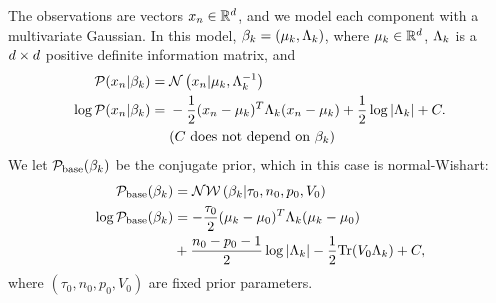 \begin{ex}
%
The observations are vectors $x_n \in \mathbb{R}^d$,
and we model each component with a multivariate Gaussian.
In this model, $\beta_k = (\mu_k, \Lambda_k)$,
where $\mu_k \in \mathbb{R}^d$, $\Lambda_k$ is a $d\times d$ positive
definite information matrix, and
%
\begin{align*}
%
\p(\x_\n \vert \beta_\k) ={}& \normdist{\x_n \vert \mu_\k, \Lambda_\k^{-1}} \\
\logp(\x_\n \vert \beta_\k) ={}&
    -\frac{1}{2}(\x_n - \mu_k)^T \Lambda_\k (\x_n - \mu_k)
    + \frac{1}{2} \log |\Lambda_\k| + \const.\\
    & \constdesc{\beta_\k}
%
\end{align*}
We let $\mathcal{P}_{\mathrm{base}}(\beta_k)$ be the conjugate prior, which in this case is normal-Wishart:
\begin{align*}
  \mathcal{P}_{\mathrm{base}}(\beta_k) &= \mathcal{N}\mathcal{W}\left(\beta_k \vert \tau_0, n_0, p_0, V_0\right)\\
  \log\mathcal{P}_{\mathrm{base}}(\beta_k) &=
      -\frac{\tau_0}{2}(\mu_k - \mu_0)^T \Lambda_k (\mu_k - \mu_0)\\
      &{} + \frac{n_0 - p_0 - 1}{2} \log |\Lambda_k| -
      \frac{1}{2} \textrm{Tr}(V_0 \Lambda_k) + C,
\end{align*}
where $(\tau_0, n_0, p_0, V_0)$ are fixed prior parameters.
%

%
\end{ex}

